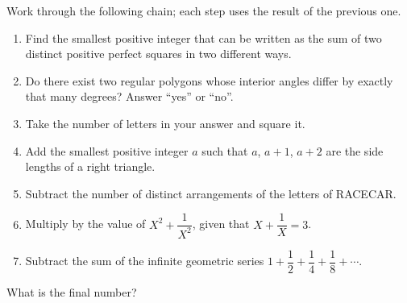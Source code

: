 Work through the following chain; each step uses the result of the previous one.
\begin{enumerate}
\item Find the smallest positive integer that can be written as the sum of two distinct positive perfect squares in two different ways.
\item Do there exist two regular polygons whose interior angles differ by exactly that many degrees? Answer ``yes'' or ``no''.
\item Take the number of letters in your answer and square it.
\item Add the smallest positive integer $a$ such that $a$, $a+1$, $a+2$ are the side lengths of a right triangle.
\item Subtract the number of distinct arrangements of the letters of RACECAR.
\item Multiply by the value of $X^2+\dfrac{1}{X^2}$, given that $X+\dfrac{1}{X}=3$.
\item Subtract the sum of the infinite geometric series $1+\dfrac{1}{2}+\dfrac{1}{4}+\dfrac{1}{8}+\cdots$.
\end{enumerate}
What is the final number?
